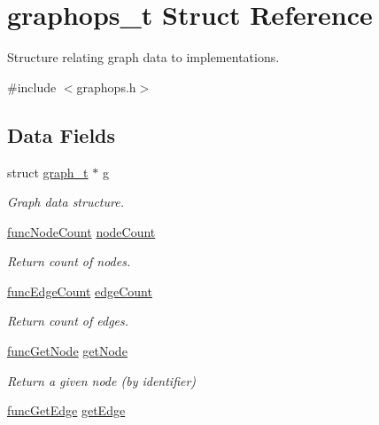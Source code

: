 \hypertarget{structgraphops__t}{}\section{graphops\+\_\+t Struct Reference}
\label{structgraphops__t}


Structure relating graph data to implementations.  




{\ttfamily \#include $<$graphops.\+h$>$}

\subsection*{Data Fields}
\begin{DoxyCompactItemize}
\item 
struct \hyperlink{structgraph__t}{graph\+\_\+t} $\ast$ \hyperlink{structgraphops__t_ac78af00da8d2616ef3499a9632309316}{g}
\begin{DoxyCompactList}\small\item\em Graph data structure. \end{DoxyCompactList}\item 
\hyperlink{graphops_8h_aa7c1a3ee12ef36bca906669c4164ccee}{func\+Node\+Count} \hyperlink{structgraphops__t_a07801b43de87d48f426d7abf7959e738}{node\+Count}
\begin{DoxyCompactList}\small\item\em Return count of nodes. \end{DoxyCompactList}\item 
\hyperlink{graphops_8h_afd0afa57e6480d123698f5e836868daa}{func\+Edge\+Count} \hyperlink{structgraphops__t_a5db6e2eee59ada7705fb54bf5f6b9ee1}{edge\+Count}
\begin{DoxyCompactList}\small\item\em Return count of edges. \end{DoxyCompactList}\item 
\hyperlink{graphops_8h_acdebce5fd9d56d8a2ebacd396fbd735a}{func\+Get\+Node} \hyperlink{structgraphops__t_ab410442ef123fc79f1c8a431502e2a23}{get\+Node}
\begin{DoxyCompactList}\small\item\em Return a given node (by identifier) \end{DoxyCompactList}\item 
\hyperlink{graphops_8h_a65a97104978aff138ce01db4b7baa237}{func\+Get\+Edge} \hyperlink{structgraphops__t_aafbe3ec7bdce040b86d7748c953cf607}{get\+Edge}

\end{DoxyCompactItemize}
